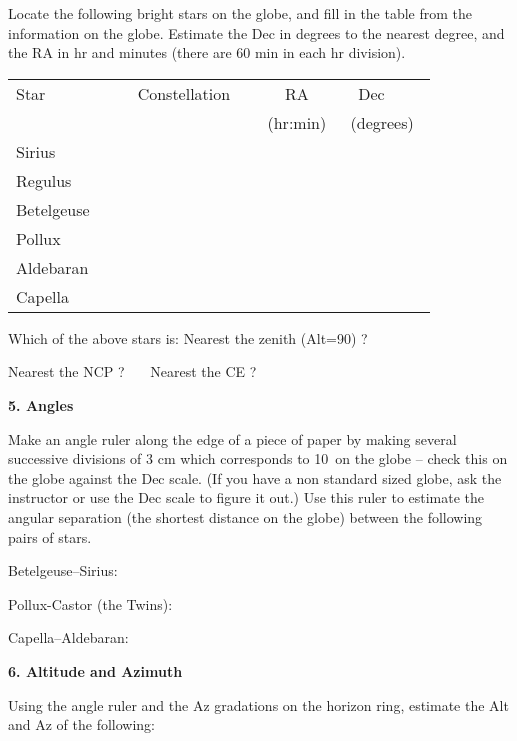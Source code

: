 \documentclass[12pt]{article}
\begin{document}
\bigskip\noindent
Locate the following bright stars on the globe,
and fill in the table from the information on the globe. Estimate the
Dec in degrees to the nearest degree, and the RA in hr and minutes
(there are 60 min in each hr division).
\begin{center}
\begin{tabular}{lccc} \hline
Star  & \ \ \ \ Constellation \ \ &\hspace{1.5cm} RA \hspace{1.5cm} & \ \ Dec \ \ \ \ \\
          &     & (hr:min) & (degrees)   \\ \hline
Sirius   &  &   &        \\ \hline
Regulus   &  &   &       \\ \hline
Betelgeuse  &  &   &       \\ \hline
Pollux  &  &   &       \\ \hline
Aldebaran  &  &   &       \\  \hline
Capella &  &   &     \\  \hline 
\end{tabular}
\end{center}

\bigskip
Which of the above stars is:
\medskip
Nearest the zenith (Alt=90\deg) ? \ \makebox[4cm]{\hrulefill}

Nearest the NCP  ?\ \makebox[4cm]{\hrulefill} \ \ 
Nearest the CE   ?\ \makebox[4cm]{\hrulefill}

\bigskip\noindent
{\bf 5. Angles}

\bigskip\noindent
Make an angle ruler along the edge of a piece of paper by making several
successive divisions of 3 cm which corresponds to 10\deg\ on the globe
-- check this on the globe against the Dec scale. (If you have a non
standard sized globe, ask the instructor or use the Dec scale to figure
it out.) Use this ruler to estimate the angular separation (the
shortest distance on the globe) between the
following pairs of stars.

\bigskip
Betelgeuse--Sirius: \makebox[4cm]{\hrulefill}

Pollux-Castor (the Twins): \makebox[4cm]{\hrulefill}

Capella--Aldebaran: \makebox[4cm]{\hrulefill}
  
\bigskip
\noindent
{\bf 6. Altitude and Azimuth}

\bigskip
\noindent
Using the angle ruler and the Az gradations on the horizon ring, 
estimate the Alt and Az of the following:
\end{document}

